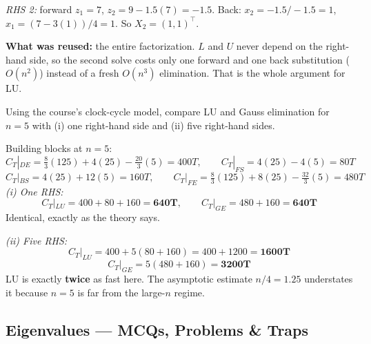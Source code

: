 \begin{probbox}
\emph{RHS 2:} forward $z_1 = 7$, $z_2 = 9-1.5(7) = -1.5$. Back: $x_2 = -1.5/-1.5 = 1$, $x_1 = (7-3(1))/4 = 1$. So $X_2 = (1,1)^\top$.

\textbf{What was reused:} the entire factorization. $L$ and $U$ never depend on the right-hand side, so the second solve costs only one forward and one back substitution ($O(n^2)$) instead of a fresh $O(n^3)$ elimination. That is the whole argument for LU.

 Using the course's clock-cycle model, compare LU and Gauss elimination for $n=5$ with (i) one right-hand side and (ii) five right-hand sides.

\ans Building blocks at $n=5$:
\[
C_T|_{DE} = \tfrac83(125)+4(25)-\tfrac{20}{3}(5) = 400T, \qquad C_T|_{FS} = 4(25)-4(5) = 80T
\]
\[
C_T|_{BS} = 4(25)+12(5) = 160T, \qquad C_T|_{FE} = \tfrac83(125)+8(25)-\tfrac{32}{3}(5) = 480T
\]
\emph{(i) One RHS:}
\[
C_T|_{LU} = 400+80+160 = \mathbf{640T}, \qquad C_T|_{GE} = 480+160 = \mathbf{640T}
\]
Identical, exactly as the theory says.

\emph{(ii) Five RHS:}
\[
C_T|_{LU} = 400 + 5(80+160) = 400+1200 = \mathbf{1600T}
\]
\[
C_T|_{GE} = 5(480+160) = \mathbf{3200T}
\]
LU is exactly \textbf{twice} as fast here. The asymptotic estimate $n/4 = 1.25$ understates it because $n=5$ is far from the large-$n$ regime.
\end{probbox}

\subsection{Eigenvalues --- MCQs, Problems \& Traps}

